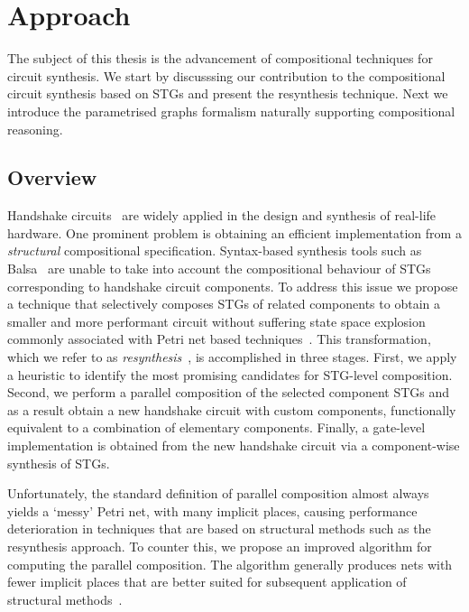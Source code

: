 \chapter{Approach\label{chap:Approach}}

The subject of this thesis is the advancement of compositional techniques for circuit synthesis. We start by discusssing our contribution to the compositional circuit synthesis based on STGs and present the resynthesis technique. Next we introduce the parametrised graphs formalism naturally supporting compositional reasoning. 


\section{Overview}
Handshake circuits~\cite{van2004handshake} are widely applied in the design and synthesis of real-life hardware.
One prominent problem is obtaining an efficient implementation from a \emph{structural} compositional specification.
Syntax-based synthesis tools such as Balsa~\cite{balsa} are unable to take into account the compositional
behaviour of STGs corresponding to handshake circuit components. To address this issue we propose 
a technique that selectively composes STGs of related components to obtain a smaller and more performant
circuit without suffering state space explosion commonly associated with Petri net based techniques~\cite{Valmari}.
This transformation, which we refer to as \emph{resynthesis}~\cite{ukaf_balsa_resynthesis}, is accomplished in three stages. First, we apply a heuristic to identify the most promising candidates for STG-level composition. Second, we perform a parallel composition of the selected component STGs and as a result obtain a new handshake circuit with custom components, functionally equivalent to a combination of elementary components. Finally, a gate-level implementation is obtained from the new handshake circuit via a component-wise synthesis of STGs.

Unfortunately, the standard definition of parallel composition almost always yields a `messy' Petri net, with many implicit places, causing performance deterioration in techniques that are based on structural methods such as the resynthesis approach. To counter this, we propose an improved algorithm for computing the parallel composition. The algorithm generally produces nets with fewer implicit places that are better suited for subsequent application of structural methods~\cite{improved_par_comp}.

